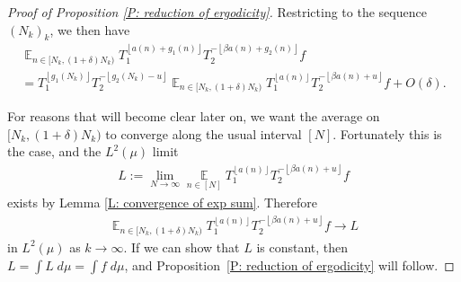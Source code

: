 \documentclass[11pt]{amsart}
\theoremstyle{definition}
\DeclareMathOperator*{\E}{\mathbb{E}}
\newcommand{\Q}{{\mathbb Q}}
\newcommand{\R}{{\mathbb R}}
\newcommand{\T}{{\mathbb T}}
\newcommand{\CH}{{\mathcal H}}
\newcommand{\veps}{\varepsilon}
\newcommand{\1}{{\mathbf{1}}}
\newcommand{\floor}[1]{{\left \lfloor #1 \right \rfloor}}
\begin{document}
\begin{proof}[Proof of Proposition \ref{P: reduction of ergodicity}]
Restricting to the sequence $(N_k)_k$, we then have
\begin{multline}\label{E: slow 1}
        \E_{n\in [N_k, (1+\delta)N_k)} T_1^{\floor{{a}(n)+g_1(n)}}T_2^{-\floor{\beta {a}(n) + g_2(n)}}f \\
        = T_1^{\floor{g_1(N_k)}}T_2^{-\floor{g_2(N_k)-u}}\E_{n\in [N_k, (1+\delta)N_k)} T_1^{\floor{{a}(n)}}T_2^{-\floor{\beta {a}(n)+u}}f +O(\delta).
\end{multline}

For reasons that will become clear later on, we want the average on $[N_k, (1+\delta)N_k)$ to converge along the usual interval $[N]$. Fortunately this is the case, and the $L^2(\mu)$ limit
\begin{align}\label{E: slow 2}
    L:= \lim_{N\to\infty}\E\limits_{n\in[N]} T_1^{\floor{{a}(n)}}T_2^{-\floor{\beta {a}(n)+u}}f
\end{align}
exists by Lemma \ref{L: convergence of exp sum}.
Therefore 
\begin{align*}
    \E_{n\in [N_k, (1+\delta)N_k)} T_1^{\floor{{a}(n)}}T_2^{-\floor{\beta {a}(n)+u}}f \to L
\end{align*}
in $L^2(\mu)$ as $k\to\infty$. If we can show that $L$ is constant, then $L = \int L\; d\mu = \int f\; d\mu$, and Proposition~\ref{P: reduction of ergodicity} will follow.




\end{proof}
\end{document}
